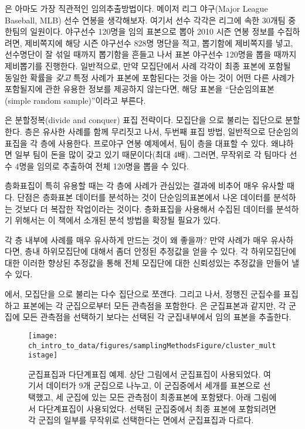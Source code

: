 은 아마도 가장 직관적인 임의추출방법이다.
메이저 리그 야구(Major League Baseball, MLB) 선수 연봉을 생각해보자.
여기서 선수 각각은 리그에 속한 30개팀 중 한팀의 일원이다.
야구선수 120명을 임의 표본으로 뽑아 2010 시즌 연봉 정보를 수집하려면,
제비쪽지에 해당 시즌 야구선수 828명 명단을 적고, 뽑기함에 제비쪽지를 넣고, 선수명단이 잘 섞일 때까지 뽑기함을 흔들고 나서
표본 야구선수 120명을 뽑을 때까지 제비뽑기를 진행한다.
일반적으로, 만약 모집단에서 사례 각각이 최종 표본에 포함될 동일한 확률을 \emph{갖고} 특정 사례가 표본에 포함된다는 것을 아는 것이 어떤 다른 사례가 포함될지에 관한 유용한 정보를 제공하지 않는다면, 해당 표본을 ``단순임의표본(simple random sample)''이라고 부른다.


은 분할정복(divide and conquer) 표집 전략이다.
모집단을 으로 불리는 집단으로 분할한다.
층은 유사한 사례를 함께 무리짓고 나서, 두번째 표집 방법, 일반적으로 단순임의표집을 각 층에 사용한다.
프로야구 연봉 예제에서, 팀이 층을 대표할 수 있다. 왜냐하면 일부 팀이 돈을 많이 갖고 있기 때문이다(최대 4배).
그러면, 무작위로 각 팀마다 선수 4명을 임의로 추출하여 전체 120명을 뽑을 수 있다.


층화표집이 특히 유용할 때는 각 층에 사례가 관심있는 결과에 비추어 매우 유사할 때다.
단점은 층화표본 데이터를 분석하는 것이 단순임의표본에서 나온 데이터를 분석하는 것보다 더 복잡한 작업이라는 것이다.
층화표집을 사용해서 수집된 데이터를 분석하기 위해서는 이 책에서 소개된 분석 방법을 확장될 필요가 있다.

\begin{example}{각 층 내부에 사례를 매우 유사하게 만드는 것이 왜 좋을까?}
만약 사례가 매우 유사하다면, 층내 하위모집단에 대해서 좀더 안정된 추정값을 얻을 수 있다.
각 하위모집단에 대한 이러한 향상된 추정값을 통해 전체 모집단에 대한 신뢰성있는 추정값을 만들어 낼 수 있다.
\end{example}


에서, 모집단을 으로 불리는 다수 집단으로 쪼갠다.
그리고 나서, 정행진 군집수를 표집하고 표본에는 각 군집으로부터 모든 관측점을 포함한다.
은 군집표본과 같지만, 각 군집에 모든 관측점을 선택하기 보다는
선택된 각 군집내부에서 임의 표본을 추출한다. %

\begin{figure}
\centering
\texttt{[image: ch\_intro\_to\_data/figures/samplingMethodsFigure/cluster\_multistage]}
\caption{
군집표집과 다단계표집 예제.
상단 그림에서 군집표집이 사용되었다. 여기서 데이터가 9개 군집으로 나누고, 이 군집중에서 세개를 표본으로 선택했고,
세 군집에 있는 모든 관측점이 최종표본에 포함됐다. 
아래 그림에서 다단계표집이 사용되었다.
선택된 군집중에서 최종 표본에 포함되려면 각 군집의 일부를 무작위로 선택한다는 면에서 군집표집과 다르다.}
\label{cluster_multistage}
\end{figure}

